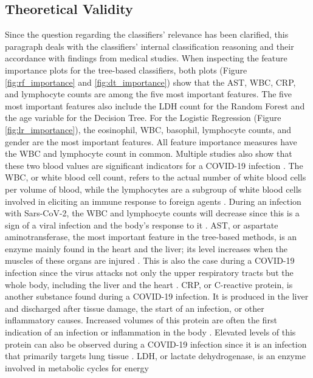 \subsection{Theoretical Validity}
\label{sec:medical}
Since the question regarding the classifiers' relevance has been 
clarified, this paragraph deals with the classifiers' internal classification 
reasoning and their accordance with findings from medical studies.
When inspecting the feature importance plots for the tree-based classifiers, 
both plots (Figure \ref{fig:rf_importance} and \ref{fig:dt_importance}) show 
that the AST, WBC, CRP, and lymphocyte counts are among the five most important 
features.
The five most important features also include the LDH count for the Random 
Forest 
and the age variable for the Decision Tree. For the Logistic Regression (Figure 
\ref{fig:lr_importance}), the eosinophil, WBC, basophil, lymphocyte counts, and 
gender are the most important features. All feature importance 
measures have the WBC and lymphocyte count in common. Multiple studies also show 
that these two blood values are significant indicators for a COVID-19 infection 
\cite{RN162, RN185, RN186}. 
The WBC, or white blood cell count, refers to the actual number of white blood 
cells per volume of blood, while the lymphocytes are a subgroup of white blood 
cells involved in eliciting an immune response to foreign agents \cite{RN137, 
RN188}. 
During an infection with Sars-CoV-2, the WBC and lymphocyte counts will 
decrease since this is a sign of a viral infection and the body's response to 
it \cite{RN162,RN186, RN185}.
AST, or aspartate aminotransferase, the most important feature in the 
tree-based methods, is an enzyme mainly found in the heart and the liver; its 
level increases when the muscles of these organs are injured \cite{RN189, 
RN188}. 
This is also the case during a COVID-19 infection since the virus attacks not 
only the upper respiratory tracts but the whole body, including the liver and 
the heart \cite{RN182}. CRP, or C-reactive protein, is another substance found 
during a COVID-19 infection. It is produced in the liver and discharged after 
tissue damage, the start of an infection, or other inflammatory causes. 
Increased volumes of this protein are often the first indication of an 
infection or inflammation in the body \cite{RN138, RN188}. Elevated levels of 
this protein can also be observed during a COVID-19 infection since it is an 
infection that primarily targets lung tissue \cite{RN187, RN162}. LDH, or 
lactate dehydrogenase, is an enzyme involved in metabolic cycles for energy 
